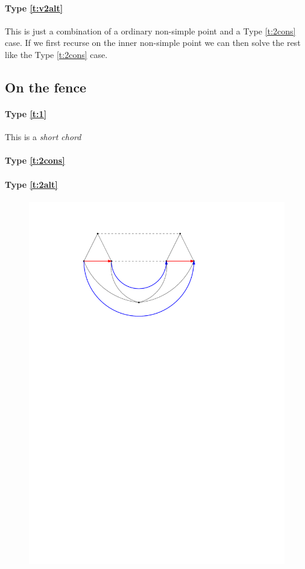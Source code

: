   \paragraph{Type \ref{t:v2alt}}
  This is just a combination of a ordinary non-simple point and a Type \ref{t:2cons} case. If we first recurse on the inner non-simple point we can then solve the rest like the Type \ref{t:2cons} case.

\subsection{On the fence}
  \paragraph{Type \ref{t:1}}
  This is a \emph{short chord}


  \paragraph{Type \ref{t:2cons}}

  \paragraph{Type \ref{t:2alt}}

  \begin{figure}[h]
    \centering
    \includegraphics[scale=1]{4cycles/img/fence_c}
    \caption{}
    \label{fig:4c:fence_c}
  \end{figure}

